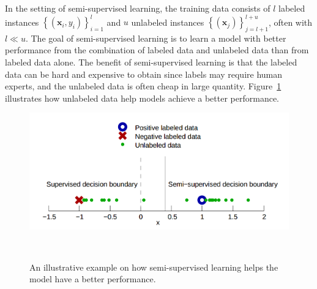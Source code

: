 \documentclass{article}
\begin{document}
In the setting of semi-supervised learning, the training data consists
of $l$ labeled instances $\left \{ (\mathbf{x}_i, y_i)
\right \}_{i=1}^{l}$ and $u$ unlabeled instances $\left \{ (\mathbf{x}_j)
\right \}_{j=l+1}^{l+u}$, often with $l \ll u$. The goal of
semi-supervised learning is to learn a model with better performance
from the combination of labeled data and unlabeled data than from
labeled data alone. The benefit of semi-supervised learning is that
the labeled data can be hard and expensive to obtain since labels may
require human experts, and the unlabeled data is often cheap in large
quantity. Figure~\ref{fg:ssl_model} illustrates how unlabeled data
help models achieve a better performance.

\begin{figure}[h] 
  \centering
  \includegraphics[width=0.95\columnwidth]{ssl.png}
  \caption{An illustrative example on how semi-supervised learning helps
    the model have a better performance.}~\label{fg:ssl_model}
\end{figure}
\end{document}
